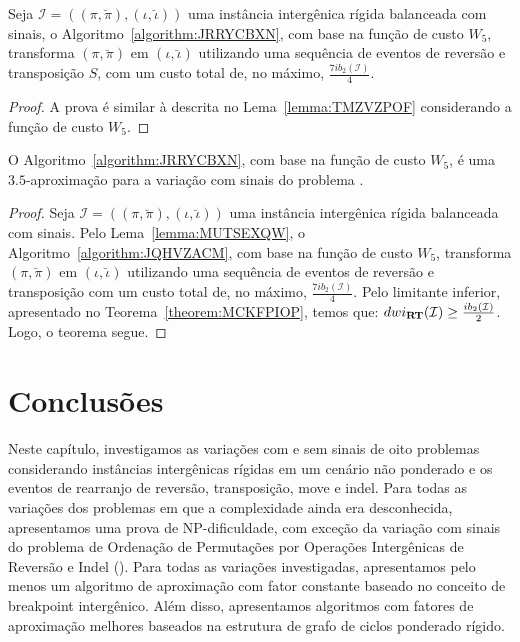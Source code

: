 \begin{lemma}\label{lemma:MUTSEXQW}
Seja $\mathcal{I} = ((\pi,\breve\pi),(\iota,\breve\iota))$ uma instância intergênica rígida balanceada com sinais, o Algoritmo~\ref{algorithm:JRRYCBXN}, com base na função de custo $W_5$, transforma $(\pi,\breve\pi)$ em $(\iota,\breve\iota)$ utilizando uma sequência de eventos de reversão e transposição $S$, com um custo total de, no máximo, $\frac{7ib_2(\mathcal{I})}{4}$.
\end{lemma}
\begin{proof}
A prova é similar à descrita no Lema~\ref{lemma:TMZVZPOF} considerando a função de custo $W_5$.
\end{proof}

\begin{theorem}\label{theorem:ZYFESTTM}
O Algoritmo~\ref{algorithm:JRRYCBXN}, com base na função de custo $W_5$, é uma $3.5$-aproxima\-ção para a variação com sinais do problema \SbWIRT{}.
\end{theorem}
\begin{proof}
Seja $\mathcal{I} = ((\pi,\breve\pi),(\iota,\breve\iota))$ uma instância intergênica rígida balanceada com sinais. Pelo Lema~\ref{lemma:MUTSEXQW}, o Algoritmo~\ref{algorithm:JQHVZACM}, com base na função de custo $W_5$, transforma $(\pi,\breve\pi)$ em $(\iota,\breve\iota)$ utilizando uma sequência de eventos de reversão e transposição com um custo total de, no máximo, $\frac{7ib_2(\mathcal{I})}{4}$. Pelo limitante inferior, apresentado no Teorema~\ref{theorem:MCKFPIOP}, temos que: $dwi_{\textbf{RT}}(\mathcal{I}) \ge \frac{ib_2(\mathcal{I})}{2}$. Logo, o teorema segue.
\end{proof}


\section{Conclusões}

Neste capítulo, investigamos as variações com e sem sinais de oito problemas considerando instâncias intergênicas rígidas em um cenário não ponderado e os eventos de rearranjo de reversão, transposição, move e indel. Para todas as variações dos problemas em que a complexidade ainda era desconhecida, apresentamos uma prova de NP-dificuldade, com exceção da variação com sinais do problema de Ordenação de Permutações por Operações Intergênicas de Reversão e Indel (\SbIRI). Para todas as variações investigadas, apresentamos pelo menos um algoritmo de aproximação com fator constante baseado no conceito de breakpoint intergênico. Além disso, apresentamos algoritmos com fatores de aproximação melhores baseados na estrutura de grafo de ciclos ponderado rígido.

